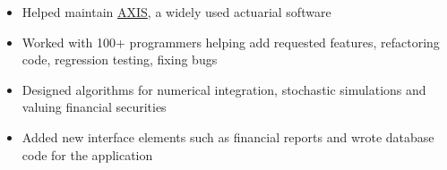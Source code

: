 \documentclass[12pt,a4paper]{altacv}
\begin{document}

\begin{fullwidth}
\makecvheader
\end{fullwidth}



\begin{itemize}
\item Helped maintain \href{https://www.ggy.com/}{AXIS}, a widely used actuarial software
\item Worked with 100+ programmers helping add requested features, refactoring code, regression testing, fixing bugs
\item Designed algorithms for numerical integration, stochastic simulations and valuing financial securities
\item Added new interface elements such as financial reports and wrote database code for the application
\end{itemize}

\divider
\end{document}
